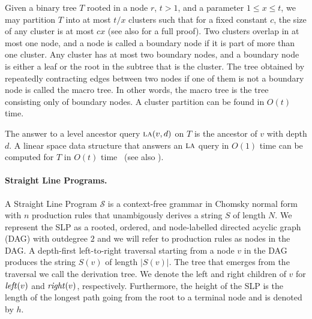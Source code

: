 \documentclass[11pt]{article}
\newcommand{\str}{\ensuremath{S} }
\newcommand{\tree}{\ensuremath{T}}
\newcommand{\slp}{\ensuremath{\mathcal{S}} }
\newcommand{\la}{\ensuremath{\textsc{la}}}
\newcommand{\leftc}{\ensuremath{\text{\textit{left}}}}
\newcommand{\rightc}{\ensuremath{\text{\textit{right}}}}
\begin{document}
Given a binary tree $\tree$ rooted in a node $r$, $t>1$, and a parameter $ 1 \leq x \leq t$, we may partition $\tree$ into at most $t/x$ clusters such that for a fixed constant $c$, the size of any cluster is at most $cx$ \cite{alstrup1997optimal,alstrup1997minimizing} (see also \cite{abiteboul2006compact} for a full proof). Two clusters overlap in at most one node, and a node is called a boundary node if it is part of more than one cluster. Any cluster has at most two boundary nodes, and a boundary node is either a leaf or the root in the subtree that is the cluster. The tree obtained by repeatedly contracting edges between two nodes if one of them is not a boundary node is called the macro tree. In other words, the macro tree is the tree consisting only of boundary nodes. A cluster partition can be found in $O(t)$ time.

The answer to a level ancestor query $\la(v,d)$ on $\tree$ is the ancestor of $v$ with depth $d$. A linear space data structure that answers an $\la$ query in $O(1)$ time can be computed for $\tree$ in $O(t)$ time~\cite{dietz1991finding} (see also \cite{berkman1994finding,alstrup2000improved,bender2004level}).


\paragraph{Straight Line Programs.}
A Straight Line Program \slp is a context-free grammar in Chomsky normal form with $n$ production rules that unambigously derives a string $\str$ of length $N$. We represent the SLP as a rooted, ordered, and node-labelled directed acyclic graph (DAG) with outdegree $2$ and we will refer to production rules as nodes in the DAG. A depth-first left-to-right traversal starting from a node $v$ in the DAG produces the string $\str(v)$ of length $|\str(v)|$. The tree that emerges from the traversal we call the derivation tree. We denote the left and right children of $v$ for $\leftc(v)$ and $\rightc(v)$, respectively. Furthermore, the height of the SLP is the length of the longest path going from the root to a terminal node and is denoted by $h$.
\end{document}
